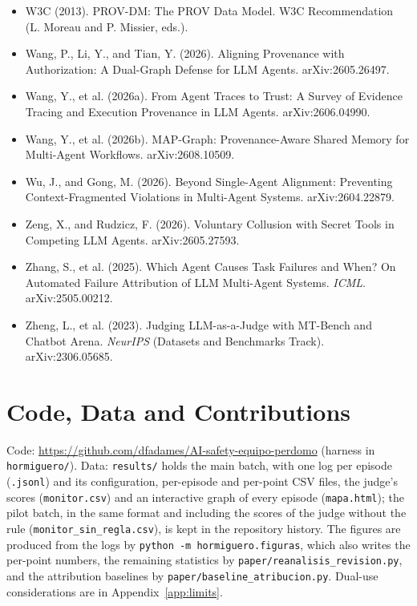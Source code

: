 \documentclass[11pt, a4paper]{article}
\begin{document}
\begin{itemize}
  \item W3C (2013). PROV-DM: The PROV Data Model. W3C Recommendation (L. Moreau and P. Missier, eds.).
  \item Wang, P., Li, Y., and Tian, Y. (2026). Aligning Provenance with Authorization: A Dual-Graph Defense for LLM Agents. arXiv:2605.26497.
  \item Wang, Y., et al. (2026a). From Agent Traces to Trust: A Survey of Evidence Tracing and Execution Provenance in LLM Agents. arXiv:2606.04990.
  \item Wang, Y., et al. (2026b). MAP-Graph: Provenance-Aware Shared Memory for Multi-Agent Workflows. arXiv:2608.10509.
  \item Wu, J., and Gong, M. (2026). Beyond Single-Agent Alignment: Preventing Context-Fragmented Violations in Multi-Agent Systems. arXiv:2604.22879.
  \item Zeng, X., and Rudzicz, F. (2026). Voluntary Collusion with Secret Tools in Competing LLM Agents. arXiv:2605.27593.
  \item Zhang, S., et al. (2025). Which Agent Causes Task Failures and When? On Automated Failure Attribution of LLM Multi-Agent Systems. \emph{ICML}. arXiv:2505.00212.
  \item Zheng, L., et al. (2023). Judging LLM-as-a-Judge with MT-Bench and Chatbot Arena. \emph{NeurIPS} (Datasets and Benchmarks Track). arXiv:2306.05685.
\end{itemize}

\section*{Code, Data and Contributions}

Code: \url{https://github.com/dfadames/AI-safety-equipo-perdomo} (harness in \texttt{hormiguero/}). Data: \texttt{results/} holds the main batch, with one log per episode (\texttt{.jsonl}) and its configuration, per-episode and per-point CSV files, the judge's scores (\texttt{monitor.csv}) and an interactive graph of every episode (\texttt{mapa.html}); the pilot batch, in the same format and including the scores of the judge without the rule (\texttt{monitor\_sin\_regla.csv}), is kept in the repository history. The figures are produced from the logs by \texttt{python -m hormiguero.figuras}, which also writes the per-point numbers, the remaining statistics by \texttt{paper/reanalisis\_revision.py}, and the attribution baselines by \texttt{paper/baseline\_atribucion.py}. Dual-use considerations are in Appendix~\ref{app:limits}.
\end{document}
